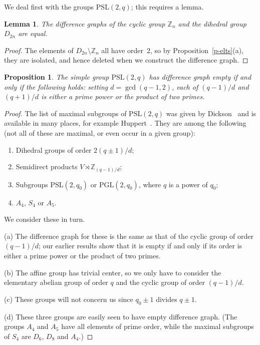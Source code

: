 \documentclass[12pt]{amsart}
\theoremstyle{plain}
\newtheorem{lemma}[theorem]{Lemma}
\newtheorem{proposition}[theorem]{Proposition}
\theoremstyle{remark}
\theoremstyle{definition}
\begin{document}
We deal first with the groups $\mathrm{PSL}(2,q)$; this requires a lemma.

\begin{lemma}
The difference graphs of the cyclic group $\mathbb{Z}_n$ and the dihedral group
$D_{2n}$ are equal.
\end{lemma}

\begin{proof}
The elements of $D_{2n}\setminus\mathbb{Z}_n$ all have order~$2$, so by
Proposition~\ref{p-elts}(a), they are isolated, and
hence deleted when we construct the difference graph.
\end{proof}

\begin{proposition}\label{Prop:null-diff-simple-grp}
The simple group $\mathrm{PSL}(2,q)$ has difference graph empty if and only if
the following holds: setting $d=\gcd(q-1,2)$, each of $(q-1)/d$ and $(q+1)/d$ is
either a prime power or the product of two primes.
\end{proposition}

\begin{proof}
The list of maximal subgroups of $\mathrm{PSL}(2,q)$ was given by
Dickson~\cite[Chapter 22]{dickson} and is available in many places, for example Huppert~\cite[Chapter 2]{huppert}. They are among the
following (not all of these are maximal, or even occur in a given group):
\begin{enumerate}
\item Dihedral groups of order $2(q\pm1)/d$;
\item Semidirect products $V\rtimes\mathbb{Z}_{(q-1)/d}$;
\item Subgroups $\mathrm{PSL}(2,q_0)$ or $\mathrm{PGL}(2,q_0)$, where $q$ is a power of $q_0$;
\item $A_4$, $S_4$ or $A_5$.
\end{enumerate}
We consider these in turn.

(a) The difference graph for these is the same as that of the cyclic group
of order $(q-1)/d$; our earlier results show that it is empty if and only if
its order is either a prime power or the product of two primes.

(b) The affine group has trivial center, so we only have to consider the
elementary abelian group of order $q$ and the cyclic group of order 
$(q-1)/d$.

(c) These groups will not concern us since $q_0\pm1$ divides $q\pm1$.

(d) These three groups are easily seen to have empty difference graph. (The
groups $A_4$ and $A_5$ have all elements of prime order, while the maximal
subgroups of $S_4$ are $D_6$, $D_8$ and $A_4$.)
\end{proof}
\end{document}
